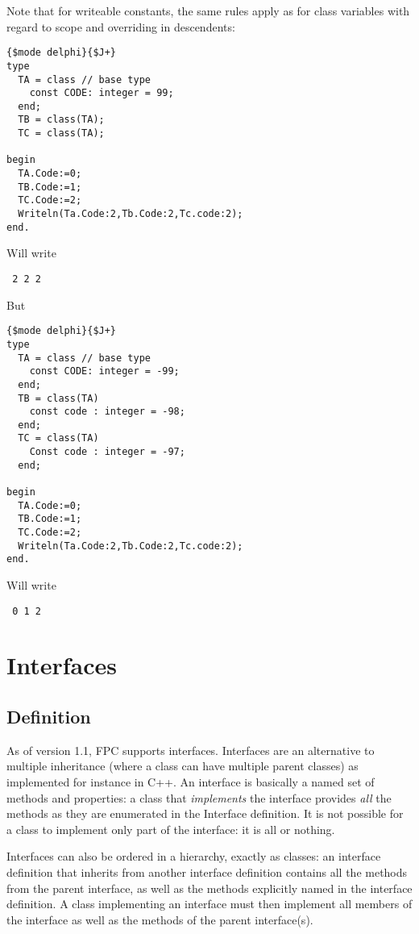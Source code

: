 Note that for writeable constants, the same rules apply as for class
variables with regard to scope and overriding in descendents:
\begin{verbatim}
{$mode delphi}{$J+}
type
  TA = class // base type
    const CODE: integer = 99;
  end;
  TB = class(TA);
  TC = class(TA);

begin
  TA.Code:=0;
  TB.Code:=1;
  TC.Code:=2;
  Writeln(Ta.Code:2,Tb.Code:2,Tc.code:2);
end.
\end{verbatim}
Will write
\begin{verbatim}
 2 2 2
\end{verbatim}
But
\begin{verbatim}
{$mode delphi}{$J+}
type
  TA = class // base type
    const CODE: integer = -99;
  end;
  TB = class(TA)
    const code : integer = -98;
  end;
  TC = class(TA)
    Const code : integer = -97;
  end;

begin
  TA.Code:=0;
  TB.Code:=1;
  TC.Code:=2;
  Writeln(Ta.Code:2,Tb.Code:2,Tc.code:2);
end.
\end{verbatim}
Will write
\begin{verbatim}
 0 1 2
\end{verbatim}

\chapter{Interfaces}
\label{ch:Interfaces}
\section{Definition}
As of version 1.1, FPC supports interfaces. Interfaces are an
alternative to multiple inheritance (where a class can have multiple
parent classes) as implemented for instance in C++.  An interface is
basically a named set of methods and properties: a class that
{\em implements} the interface provides {\em all} the methods as
they are enumerated in the Interface definition. It is not possible for a
class to implement only part of the interface: it is all or nothing.

Interfaces can also be ordered in a hierarchy, exactly as classes:
an interface definition that inherits from another interface definition
contains all the methods from the parent interface, as well as the methods
explicitly named in the interface definition. A class implementing an
interface must then implement all members of the interface as well as the
methods of the parent interface(s).

